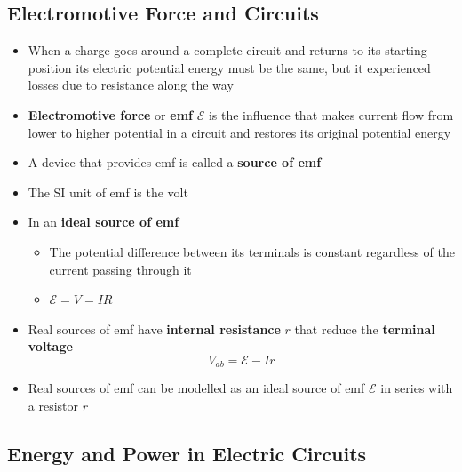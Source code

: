 \documentclass{article}
\begin{document}
\subsection{Electromotive Force and Circuits}

\begin{itemize}
  \item When a charge goes around a complete circuit and returns to its starting position its electric potential energy must be the same, but it experienced losses due to resistance along the way

  \item \textbf{Electromotive force} or \textbf{emf} $\mathcal{E}$ is the influence that makes current flow from lower to higher potential in a circuit and restores its original potential energy

  \item A device that provides emf is called a \textbf{source of emf}

  \item The SI unit of emf is the volt

  \item In an \textbf{ideal source of emf}

        \begin{itemize}
          \item The potential difference between its terminals is constant regardless of the current passing through it

          \item $\mathcal{E} = V = I R$
        \end{itemize}

  \item Real sources of emf have \textbf{internal resistance} $r$ that reduce the \textbf{terminal voltage} \[V_{ab} = \mathcal{E} - I r\]

  \item Real sources of emf can be modelled as an ideal source of emf $\mathcal{E}$ in series with a resistor $r$
\end{itemize}

\subsection{Energy and Power in Electric Circuits}
\end{document}
